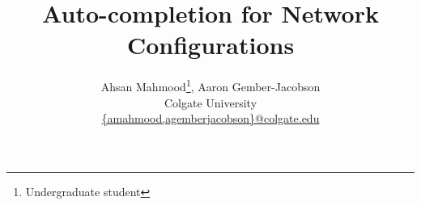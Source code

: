 \documentclass[letterpaper,twocolumn,10pt]{article}
\begin{document}
\title{Auto-completion for Network Configurations}
\author{
    {\rm Ahsan Mahmood\thanks{Undergraduate student}, Aaron Gember-Jacobson}\\
    Colgate University\\
    \url{{amahmood,agemberjacobson}@colgate.edu}}
\maketitle

%




\begin{footnotesize}


\end{footnotesize}
\end{document}
